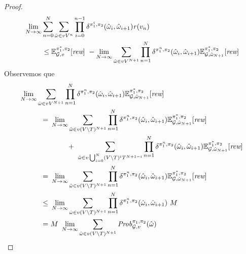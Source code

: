 \begin{proof}
  \begin{align}
    & \lim_{N \rightarrow \infty} \sum^{N}_{n=0}\sum_{\hat{\omega} \in vV^{n}} \prod^{n-1}_{i=0}\delta^{\pi_{1}^i,\pi_{2}}(\hat{\omega}_i, \hat{\omega}_{i+1}) \mathit{r}(v_n) \label{thm:semimarkov-to-memoryless-eq0}\\
    & \hspace{2.5em} \leq 
      \mathbb{E}^{\pi^*_{1}, \pi_{2}}_{\mathcal{G},v}[\textit{rew}] \ - \lim_{N \rightarrow \infty} \sum_{\hat{\omega} \in vV^{N+1}}\prod^{N}_{n=1}\delta^{\pi_{1}^n,\pi_{2}}(\hat{\omega}_i,\hat{\omega}_{i+1}) \mathbb{E}^{\pi^*_{1}, \pi_{2}}_{\mathcal{G}, \hat{\omega}_{N+1}}[\textit{rew}] \notag
  \end{align}
  Observemos que
  \begin{align}
    \lim_{N \rightarrow \infty} \sum_{\hat{\omega} \in vV^{N+1}}\prod^{N}_{n=1}\delta^{\strat{1}^n,\strat{2}}(\hat{\omega}_i,\hat{\omega}_{i+1}) \Expect{\starredstrat{1}}{\strat{2}}_{\StochG, \hat{\omega}_{N+1}}[\Rewards] \hspace{-16em} & \notag \\
    = \ & \lim_{N \rightarrow \infty} \sum_{\hat{\omega} \in v(V\setminus T)^{N+1}}\prod^{N}_{n=1}\delta^{\strat{1}^n,\strat{2}}(\hat{\omega}_i,\hat{\omega}_{i+1}) \Expect{\starredstrat{1}}{\strat{2}}_{\StochG, \hat{\omega}_{N+1}}[\Rewards] \label{thm:semimarkov-to-memoryless-lim-eq1}\\
    & \phantom{\lim_{N \rightarrow \infty}} + \
    \sum_{\hat{\omega} \in v\bigcup_{i=0}^N(V\setminus T)^iT^{N+1-i}}\prod^{N}_{n=1}\delta^{\strat{1}^n,\strat{2}}(\hat{\omega}_i,\hat{\omega}_{i+1}) \Expect{\starredstrat{1}}{\strat{2}}_{\StochG, \hat{\omega}_{N+1}}[\Rewards] \notag \\
    = \ & \lim_{N \rightarrow \infty} \sum_{\hat{\omega} \in v(V\setminus T)^{N+1}}\prod^{N}_{n=1}\delta^{\strat{1}^n,\strat{2}}(\hat{\omega}_i,\hat{\omega}_{i+1}) \Expect{\starredstrat{1}}{\strat{2}}_{\StochG, \hat{\omega}_{N+1}}[\Rewards] \label{thm:semimarkov-to-memoryless-lim-eq2}\\
    \leq \ & \lim_{N \rightarrow \infty} \sum_{\hat{\omega} \in v(V\setminus T)^{N+1}}\prod^{N}_{n=1}\delta^{\strat{1}^n,\strat{2}}(\hat{\omega}_i,\hat{\omega}_{i+1}) \ M \label{thm:semimarkov-to-memoryless-lim-eq3}\\
    = \ & M \ \lim_{N \rightarrow \infty} \sum_{\hat{\omega} \in v(V\setminus T)^{N+1}} \Prob{\strat{1}}{\strat{2}}_{\StochG,v}(\hat{\omega}) \label{thm:semimarkov-to-memoryless-lim-eq4}\\

\end{align}
\end{proof}
